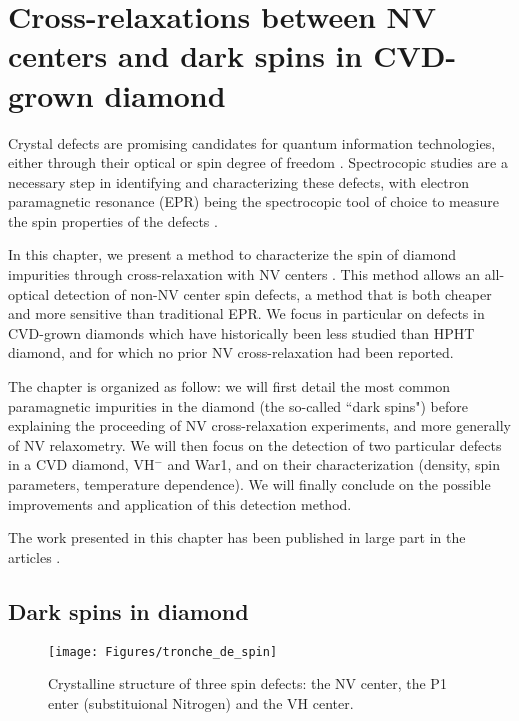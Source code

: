 \documentclass[a4paper,11pt]{report}
\title{}
\begin{document}
\chapter{Cross-relaxations between NV centers and dark spins in CVD-grown diamond}
Crystal defects are promising candidates for quantum information technologies, either through their optical or spin degree of freedom \citep{aharonovich2016solid, atature2018material, bassett2019quantum}. Spectrocopic studies are a necessary step in identifying and characterizing these defects, with electron paramagnetic resonance (EPR) being the spectrocopic tool of choice to measure the spin properties of the defects \citep{newton2007epr}. 

In this chapter, we present a method to characterize the spin of diamond impurities through cross-relaxation with NV centers \citep{hall2016detection,pellet2021optical}. This method allows an all-optical detection of non-NV center spin defects, a method that is both cheaper and more sensitive than traditional EPR. We focus in particular on defects in CVD-grown diamonds which have historically been less studied than HPHT diamond, and for which no prior NV cross-relaxation had been reported. 

The chapter is organized as follow: we will first detail the most common paramagnetic impurities in the diamond (the so-called ``dark spins") before explaining the proceeding of NV cross-relaxation experiments, and more generally of NV relaxometry. We will then focus on the detection of two particular defects in a CVD diamond, VH$^-$ and War1, and on their characterization (density, spin parameters, temperature dependence). We will finally conclude on the possible improvements and application of this detection method.

The work presented in this chapter has been published in large part in the articles \citep{pellet2021optical, ngambou2022improving}.


\section{Dark spins in diamond}

\begin{figure}[h!]
\centering
\texttt{[image: Figures/tronche\_de\_spin]}
\caption{Crystalline structure of three spin defects: the NV center, the P1 enter (substituional Nitrogen) and the VH center.} 
\label{repr NV P1 VH}
\end{figure}
\end{document}
